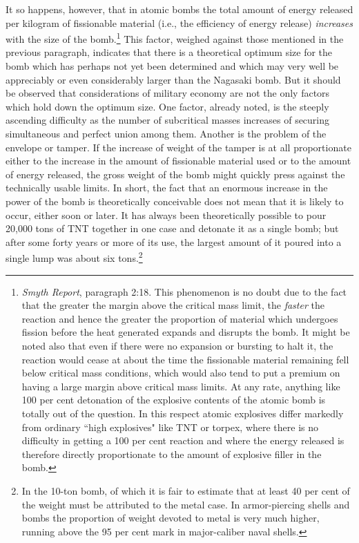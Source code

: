 It so happens, however, that in atomic bombs the total amount of energy released per kilogram of fissionable material (i.e., the efficiency of energy release) \emph{increases} with the size of the bomb.\footnote{\emph{Smyth Report}, paragraph 2:18. This phenomenon is no doubt due to the fact that the greater the margin above the critical mass limit, the \emph{faster} the reaction and hence the greater the proportion of material which undergoes fission before the heat generated expands and disrupts the bomb. It might be noted also that even if there were no expansion or bursting to halt it, the reaction would cease at about the time the fissionable material remaining fell below critical mass conditions, which would also tend to put a premium on having a large margin above critical mass limits. At any rate, anything like 100 per cent detonation of the explosive contents of the atomic bomb is totally out of the question. In this respect atomic explosives differ markedly from ordinary ``high explosives" like TNT or torpex, where there is no difficulty in getting a 100 per cent reaction and where the energy released is therefore directly proportionate to the amount of explosive filler in the bomb.} This factor, weighed against those mentioned in the previous paragraph, indicates that there is a theoretical optimum size for the bomb which has perhaps not yet been determined and which may very well be appreciably or even considerably larger than the Nagasaki bomb. But it should be observed that considerations of military economy are not the only factors which hold down the optimum size. One factor, already noted, is the steeply ascending difficulty as the number of subcritical masses increases of securing simultaneous and perfect union among them. Another is the problem of the envelope or tamper. If the increase of weight of the tamper is at all proportionate either to the increase in the amount of fissionable material used or to the amount of energy released, the gross weight of the bomb might quickly press against the technically usable limits. In short, the fact that an enormous increase in the power of the bomb is theoretically conceivable does not mean that it is likely to occur, either soon or later. It has always been theoretically possible to pour 20,000 tons of TNT together in one case and detonate it as a single bomb; but after some forty years or more of its use, the largest amount of it poured into a single lump was about six tons.\footnote{In the 10-ton bomb, of which it is fair to estimate that at least 40 per cent of the weight must be attributed to the metal case. In armor-piercing shells and bombs the proportion of weight devoted to metal is very much higher, running above the 95 per cent mark in major-caliber naval shells.}

